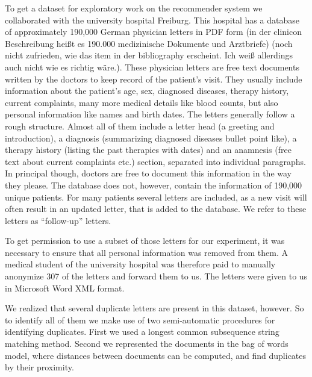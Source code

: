 To get a dataset for exploratory work on the recommender system we collaborated with the university hospital Freiburg. This hospital has a database of approximately 190,000 German
physician letters in PDF form \citep{spadaro2012} (in der clinicon Beschreibung heißt es 190.000 medizinische Dokumente und Arztbriefe) (noch nicht zufrieden, wie das item in der bibliography erscheint. Ich weiß allerdings auch nicht wie es richtig wäre.). These physician letters are free text documents
written by the doctors to keep record of the patient's visit. They
usually include information about the patient's age, sex, diagnosed
diseases, therapy history, current complaints, many more medical details
like blood counts, but also personal information like names and birth dates.
The letters generally follow a rough structure. Almost all of them include a letter head (a greeting and introduction), a diagnosis (summarizing diagnosed diseases bullet point like), a therapy history (listing the past therapies with dates) and an anamnesis (free text about current complaints etc.) section, separated into individual paragraphs. In principal though, doctors are free to document this information in the way they please. The database does not, however, contain the information of 190,000 unique patients. For many patients several letters are included, as a new visit will often result in an updated letter, that is added to the database. We refer to these letters as ``follow-up'' letters.

To get permission to use a subset of those letters for our experiment, it was necessary to ensure that all personal information was removed from them. A medical student of the university hospital was therefore paid to manually anonymize 307 of the letters and forward them to us. The letters were given to us in Microsoft Word XML format.

We realized that several duplicate letters are present in this dataset, however. So to identify all of them we make use of two semi-automatic procedures for identifying duplicates. First we used a longest common subsequence string matching method. Second we represented the documents in the bag of words model, where distances between documents can be computed, and find duplicates by their proximity.


